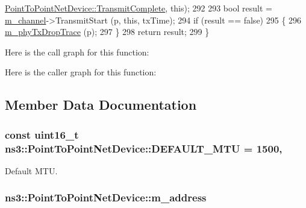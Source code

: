 \begin{DoxyCode}
      \hyperlink{classns3_1_1PointToPointNetDevice_a86dc2c399ab676de4c0dfbd08366e7e2}{PointToPointNetDevice::TransmitComplete}, \textcolor{keyword}{this});
292 
293   \textcolor{keywordtype}{bool} result = \hyperlink{classns3_1_1PointToPointNetDevice_a1792fcbe4da3c93ed8aaa2dcc1914029}{m\_channel}->TransmitStart (p, \textcolor{keyword}{this}, txTime);
294   \textcolor{keywordflow}{if} (result == \textcolor{keyword}{false})
295     \{
296       \hyperlink{classns3_1_1PointToPointNetDevice_a66a13667106d35d2cbf70c166617c660}{m\_phyTxDropTrace} (p);
297     \}
298   \textcolor{keywordflow}{return} result;
299 \}
\end{DoxyCode}


Here is the call graph for this function\+:




Here is the caller graph for this function\+:




\subsection{Member Data Documentation}
\subsubsection[{\texorpdfstring{D\+E\+F\+A\+U\+L\+T\+\_\+\+M\+TU}{DEFAULT_MTU}}]{\setlength{\rightskip}{0pt plus 5cm}const uint16\+\_\+t ns3\+::\+Point\+To\+Point\+Net\+Device\+::\+D\+E\+F\+A\+U\+L\+T\+\_\+\+M\+TU = 1500\hspace{0.3cm}{\ttfamily [static]}, {\ttfamily [private]}}\hypertarget{classns3_1_1PointToPointNetDevice_a053e12ea8d9014b856c64bd086a43f21}{}\label{classns3_1_1PointToPointNetDevice_a053e12ea8d9014b856c64bd086a43f21}


Default M\+TU. 

\subsubsection[{\texorpdfstring{m\+\_\+address}{m_address}}]{ ns3\+::\+Point\+To\+Point\+Net\+Device\+::m\+\_\+address\hspace{0.3cm}{\ttfamily [private]}}\hypertarget{classns3_1_1PointToPointNetDevice_ab5e476570bb9311ca53a457fc987bdb8}{}\label{classns3_1_1PointToPointNetDevice_ab5e476570bb9311ca53a457fc987bdb8}


